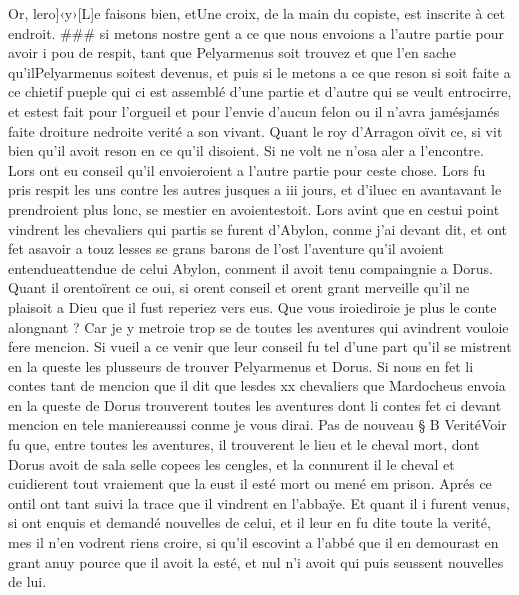 \documentclass{article}
\begin{document}
\begin{pages}
      Or, lero]‹y›[L]e 
      faisons bien, etUne croix, de la main du copiste, est inscrite à cet endroit. ### 
      si metons nostre gent a ce que nous envoions a l’autre partie pour avoir i pou de respit, tant que 
      Pelyarmenus soit trouvez et que 
      l’en sache qu’ilPelyarmenus 
      soitest devenus, et puis si le metons a ce que reson si soit faite a 
      ce chietif pueple qui ci est assemblé d’une partie et d’autre qui se veult entrocirre, et 
      estest fait pour l’orgueil et pour l’envie d’aucun felon ou il n’avra 
      jamésjamés faite 
      droiture nedroite verité a son vivant. \pend
\pstart Quant le roy d’Arragon 
   oïvit ce, si vit bien qu’il avoit reson en ce qu’il disoient. Si 
   ne volt ne n’osa aler a l’encontre. Lors ont eu conseil qu’il 
   envoieroient a l’autre partie pour ceste chose. Lors fu pris respit les uns contre les autres jusques a iii jours, 
   et d’iluec en avantavant le prendroient plus lonc, se mestier en 
   avoientestoit. Lors avint que en cestui point vindrent les chevaliers 
   qui partis se furent d’Abylon, 
   conme j’ai devant dit, et ont fet asavoir 
   a touz lesses se 
   grans barons de l’ost l’aventure qu’il avoient entendueattendue 
   de celui Abylon, conment il avoit tenu compaingnie a 
   Dorus. Quant il orentoïrent ce 
   oui, si orent conseil et 
   orent grant merveille qu’il ne plaisoit a Dieu que il fust reperiez vers eus. Que vous 
      iroiediroie je 
      plus le conte alongnant ? Car je y metroie trop se de toutes les aventures qui 
         avindrent vouloie fere mencion. Si vueil a ce venir que leur conseil fu tel d’une part 
   qu’il se mistrent en la queste les plusseurs 
   de trouver Pelyarmenus et Dorus. 
   Si nous en fet li contes tant de mencion que il dit que 
   lesdes xx chevaliers que 
   Mardocheus envoia en la queste de Dorus trouverent toutes 
   les aventures dont li contes fet ci devant mencion 
      en tele maniereaussi conme je vous dirai. \pend
\pstart Pas de nouveau § B
   VeritéVoir fu que, entre toutes les aventures, 
   il trouverent le lieu et le cheval mort, 
   dont Dorus avoit de sala selle copees 
   les cengles, et la connurent il le cheval et cuidierent tout vraiement que la eust il esté mort ou 
      mené em prison. Aprés ce 
   ontil ont tant suivi la trace que il vindrent en 
   l’abbaÿe. Et quant il i furent venus, si ont enquis et demandé nouvelles de celui,
   et il leur en fu dite toute la verité, mes il n’en vodrent riens croire, si qu’il escovint a l’abbé 
   que il en demourast en grant anuy pource que il avoit la esté, et nul n’i avoit qui puis seussent nouvelles de lui. 

\end{pages}
\end{document}
